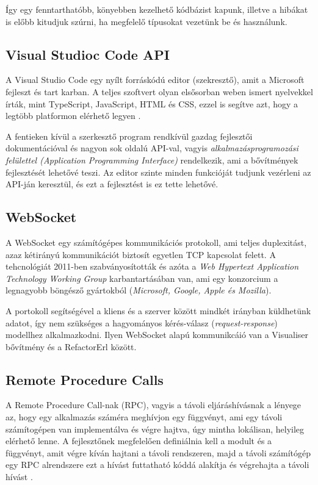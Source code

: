 Így egy fenntarthatóbb, könyebben kezelhető kódbázist kapunk, illetve a hibákat is előbb kitudjuk szúrni, ha megfelelő típusokat vezetünk be és használunk.

\subsection{Visual Studioc Code API}
A Visual Studio Code egy nyílt forráskódú editor (szekresztő), amit a Microsoft fejleszt és tart karban. A teljes szoftvert olyan elsősorban weben ismert nyelvekkel írták, mint TypeScript, JavaScript, HTML és CSS, ezzel is segítve azt, hogy a legtöbb platformon elérhető legyen \cite{wikipediaVSCODE}.

A fentieken kívül a szerkesztő program rendkívül gazdag fejlesztői dokumentációval és nagyon sok oldalú API-val, vagyis \textit{alkalmazásprogramozási felülettel (Application Programming Interface)} rendelkezik, ami a bővítmények fejlesztését lehetővé teszi. Az editor szinte minden funkcióját tudjunk vezérleni az API-ján keresztül, és ezt a fejlesztést is ez tette lehetővé.

\subsection{WebSocket}
A WebSocket egy számítógépes kommunikációs protokoll, ami teljes duplexitást, azaz kétirányú kommunikációt biztosít egyetlen TCP kapcsolat felett. A tehcnológiát 2011-ben szabványosították és azóta a \textit{Web Hypertext Application Technology Working Group} karbantartásában van, ami egy konzorcium a legnagyobb böngésző gyártokból (\textit{Microsoft, Google, Apple és Mozilla}). \cite{websocketWikipedia}

A portokoll segítségével a kliens és a szerver között mindkét irányban küldhetünk adatot, így nem szükséges a hagyományos kérés-válasz (\textit{request-response}) modellhez alkalmazkodni. Ilyen WebSocket alapú kommunikcáió van a Visualiser bővítmény és a RefactorErl között. 

\subsection{Remote Procedure Calls}
A Remote Procedure Call-nak (RPC), vagyis a távoli eljáráshívásnak a lényege az, hogy egy alkalmazás száméra meghívjon egy függvényt, ami egy távoli számítogépen van implementálva és végre hajtva, úgy mintha lokálisan, helyileg elérhető lenne. A fejlesztőnek megfelelően definiálnia kell a modult és a függvényt, amit végre kíván hajtani a távoli rendszeren, majd a távoli számítógép egy RPC alrendszere ezt a hívást futtatható kóddá alakítja és végrehajta a távoli hívást \cite{distributedSystems}.

